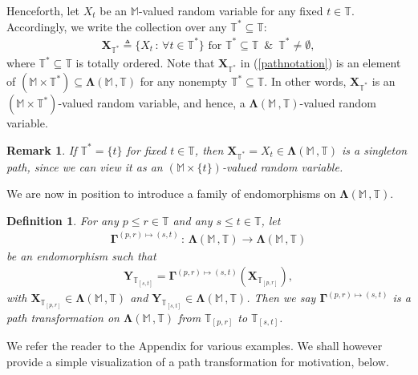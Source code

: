 \documentclass[12pt,a4paper]{article}
\newtheorem{defn}[thm]{Definition}
\newtheorem{rem}[thm]{Remark}
\def\T{\mathbb{T}}
\begin{document}
Henceforth, let $X_t$ be an $\mathbb M$-valued random variable for any fixed $t\in\T$. Accordingly, we write the collection over any $\T^*\subseteq\T$:
\begin{align}
\boldsymbol{X}_{\T^*} \triangleq \{X_t \, : \, \forall t\in\T^*\} \,\, \text{for $\T^*\subseteq\T$} \,\,\,\text{\&}\,\,\, \T^* \neq \emptyset, \label{pathnotation}
\end{align}
where $\T^*\subseteq\T$ is totally ordered. Note that $\boldsymbol{X}_{\T^*}$ in (\ref{pathnotation}) is an element of $(\mathbb M\times\T^*) \subseteq \boldsymbol{\Lambda}(\mathbb M \,, \T)$ for any nonempty $\T^*\subseteq\T$. In other words, $\boldsymbol{X}_{\T^*}$ is an $(\mathbb M\times\T^*)$-valued random variable, and hence, a $\boldsymbol{\Lambda}(\mathbb M \,, \T)$-valued random variable.
%
\begin{rem}
\label{remone}{\em
If $\T^* = \{t\}$ for fixed $t\in\T$, then $\boldsymbol{X}_{\T^*} = X_t \in \boldsymbol{\Lambda}(\mathbb M \,, \T)$ is a \emph{singleton path}, since we can view it as an $(\mathbb M\times\{t\})$-valued random variable.}
\end{rem}
%
We are now in position to introduce a family of endomorphisms on $\boldsymbol{\Lambda}(\mathbb M \,, \T)$. 
%
\begin{defn}
\label{transformationsgeneral} {\em
For any $p\leq r \in \T$ and any $s\leq t \in \T$, let 
\begin{align}
\boldsymbol{\Gamma}^{(p,r)\mapsto(s,t)} \,: \, \boldsymbol{\Lambda}(\mathbb M \,, \T) \rightarrow \boldsymbol{\Lambda}(\mathbb M \,, \T)  
\end{align}
be an endomorphism such that
\begin{align}
\boldsymbol{Y}_{\T_{[s,t]}} = \boldsymbol{\Gamma}^{(p,r)\mapsto(s,t)}\left( \boldsymbol{X}_{\T_{[p,r]}}\right), \label{mapgeneralformula}
\end{align}
with $\boldsymbol{X}_{\T_{[p,r]}} \in \boldsymbol{\Lambda}(\mathbb M \,, \T)$ and $\boldsymbol{Y}_{\T_{[s,t]}} \in \boldsymbol{\Lambda}(\mathbb M \,, \T)$. Then we say $\boldsymbol{\Gamma}^{(p,r)\mapsto(s,t)}$ is a \emph{path transformation} on $\boldsymbol{\Lambda}(\mathbb M \,, \T)$ from $\T_{[p,r]}$ to $\T_{[s,t]}$. }
\end{defn}
%
We refer the reader to the Appendix for various examples. We shall however provide a simple visualization of a path transformation for motivation, below.
\end{document}
